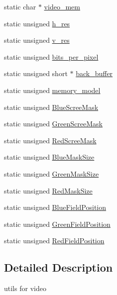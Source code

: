 \begin{DoxyCompactItemize}
\item 
static char $\ast$ \mbox{\hyperlink{group__video_ga93a24e067b9083bed6fb5c0336fd7a01}{video\+\_\+mem}}
\item 
static unsigned \mbox{\hyperlink{group__video_ga43e7e5a0a8f9069e6413b2066ca52f3e}{h\+\_\+res}}
\item 
static unsigned \mbox{\hyperlink{group__video_ga5bda1b499253a8fbf3cab646f8760391}{v\+\_\+res}}
\item 
static unsigned \mbox{\hyperlink{group__video_ga89fa3fb58e975d148fcb2413e24b78a1}{bits\+\_\+per\+\_\+pixel}}
\item 
static unsigned short $\ast$ \mbox{\hyperlink{group__video_ga41adf31cc71966f661d4c9bdef60eabc}{back\+\_\+buffer}}
\item 
static unsigned \mbox{\hyperlink{group__video_ga94d1ad38320b633fccc0727cf1006e8f}{memory\+\_\+model}}
\item 
static unsigned \mbox{\hyperlink{group__video_gabbaa4ba33859ae6a9e1880b78b9b3c74}{Blue\+Scree\+Mask}}
\item 
static unsigned \mbox{\hyperlink{group__video_gabd638c84042b50e5a4940b7b67040fd5}{Green\+Scree\+Mask}}
\item 
static unsigned \mbox{\hyperlink{group__video_ga4b1b7cf1a9d2ad7605c72850290546e0}{Red\+Scree\+Mask}}
\item 
static unsigned \mbox{\hyperlink{group__video_ga202380a3a4b30055510bd3aec0c4a552}{Blue\+Mask\+Size}}
\item 
static unsigned \mbox{\hyperlink{group__video_ga9a171eef67bbe18d271e3b6038e6b72c}{Green\+Mask\+Size}}
\item 
static unsigned \mbox{\hyperlink{group__video_gac8bf88bea3e2d2723d6c038fcd75589f}{Red\+Mask\+Size}}
\item 
static unsigned \mbox{\hyperlink{group__video_ga078507f7d25b8fb655535ee5ef313e20}{Blue\+Field\+Position}}
\item 
static unsigned \mbox{\hyperlink{group__video_ga711985669f3b146a60c238efc74e6e7f}{Green\+Field\+Position}}
\item 
static unsigned \mbox{\hyperlink{group__video_ga3a7a89d7ef4fe63fce7122ef46f3045b}{Red\+Field\+Position}}
\end{DoxyCompactItemize}


\subsection{Detailed Description}
utils for video 

